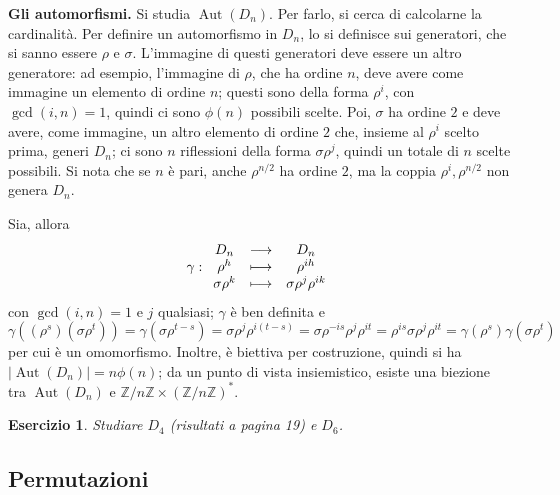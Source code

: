 \documentclass[11pt]{scrartcl}
\theoremstyle{style1}
\newtheorem{esercizio}{Esercizio}[section]
\numberwithin{equation}{subsection}
\renewcommand{\textbf}[1]{\textsf{\bfseries #1}}
\begin{document}
\vspace{5pt}
\textbf{Gli automorfismi.} 
Si studia $\operatorname{Aut} (D_n)$. Per farlo, si cerca di calcolarne la cardinalit\`a.
Per definire un automorfismo in $D_n$, lo si definisce sui generatori, che si sanno essere $\rho $ e $\sigma $.
L'immagine di questi generatori deve essere un altro generatore: ad esempio, l'immagine di $\rho $, che ha ordine $n$, deve avere come immagine un elemento di ordine $n$; questi sono della forma $\rho ^i$, con $\operatorname{gcd}(i,n) =1$, quindi ci sono $\phi (n)$ possibili scelte.
Poi, $\sigma $ ha ordine $2$ e deve avere, come immagine, un altro elemento di ordine $2$ che, insieme al $\rho ^i$ scelto prima, generi $D_n$; ci sono $n$ riflessioni della forma $\sigma \rho ^j$, quindi un totale di $n$ scelte possibili.
Si nota che se $n$ \`e pari, anche $\rho ^{ n / 2} $ ha ordine $2$, ma la coppia $\rho ^i, \rho ^{n / 2} $ non genera $D_n$.

Sia, allora 
\[
\gamma : 
\begin{array}
	{c c c}
	D_n & \longrightarrow & D_n\\
	\rho ^h & \longmapsto & \rho ^{ih} \\
	\sigma \rho ^k & \longmapsto & \sigma \rho ^j \rho ^{ik} 
\end{array}
\] 
con $\operatorname{gcd}(i,n) =1$ e $j$ qualsiasi; $\gamma$ \`e ben definita e 
\[
\gamma\left((\rho ^s)(\sigma \rho ^t)\right) = \gamma(\sigma \rho ^{t-s} )= \sigma \rho ^j \rho ^{i(t-s)} = \sigma \rho ^{-is} \rho ^j \rho ^{it} = \rho ^{is} \sigma \rho ^j\rho ^{it} = \gamma(\rho ^s)\gamma(\sigma \rho ^t)
\] 
per cui \`e un omomorfismo. 
Inoltre, \`e biettiva per costruzione, quindi si ha $\lvert \operatorname{Aut} (D_n) \rvert = n \phi (n)$; da un punto di vista insiemistico, esiste una biezione tra $\operatorname{Aut} (D_n)$ e $\mathbb{Z} / n\mathbb{Z} \times \left(\mathbb{Z} / n\mathbb{Z}\right) ^*$.
\begin{esercizio}
	Studiare $D_4$ (risultati a pagina 19) e $D_6$.
\end{esercizio}
\subsection{Permutazioni}
\end{document}
